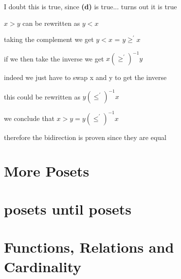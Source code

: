 \documentclass[12pts,A4]{article}
\begin{document}
\begin{flushleft}
    I doubt this is true, since \textbf{(d)} is true...
    turns out it is true

    $ x > y $ can be rewritten as $ y < x$

    
    taking the complement we get  $ y < x$ = $ y \geq ^{'} x $
   
    if we then take the inverse we get $ x (\geq ^{'} )^{-1} y $
    
    indeed we just have to swap x and y to get the inverse
    
    this could be rewritten as $ y (\leq ^{'} )^{-1} x $
    \bigskip

    we conclude that $ x > y =  y (\leq^{'})^{-1} x $  

    therefore the bidirection is proven since they are equal


\end{flushleft}
\section {More Posets}

\section{posets until posets}

\section{Functions, Relations and Cardinality}
\end{document}
